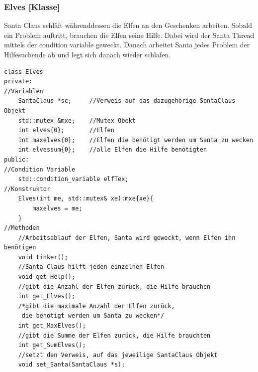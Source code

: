 \documentclass[a4paper,12pt]{article}
\begin{document}
\subsubsection{Elves [Klasse]}
Santa Claus schläft währenddessen die Elfen an den Geschenken arbeiten. Sobald ein Problem auftritt, brauchen
die Elfen seine Hilfe. Dabei wird der Santa Thread mittels der condition variable geweckt. Danach arbeitet Santa jedes Problem der Hilfesuchende ab und legt sich
danach wieder schlafen.
\begin{verbatim}
class Elves
private:
//Variablen
    SantaClaus *sc;     //Verweis auf das dazugehörige SantaClaus Objekt
    std::mutex &mxe;    //Mutex Obekt
    int elves{0};       //Elfen
    int maxelves{0};    //Elfen die benötigt werden um Santa zu wecken
    int elvessum{0};    //alle Elfen die Hilfe benötigten 
public:
//Condition Variable
    std::condition_variable elfTex;
//Konstruktor
    Elves(int me, std::mutex& xe):mxe{xe}{
        maxelves = me;
    }
//Methoden
    //Arbeitsablauf der Elfen, Santa wird geweckt, wenn Elfen ihn benötigen
    void tinker();
    //Santa Claus hilft jeden einzelnen Elfen
    void get_Help();
    //gibt die Anzahl der Elfen zurück, die Hilfe brauchen
    int get_Elves();
    /*gibt die maximale Anzahl der Elfen zurück,
     die benötigt werden um Santa zu wecken*/
    int get_MaxElves();
    //gibt die Summe der Elfen zurück, die Hilfe brauchten
    int get_SumElves();
    //setzt den Verweis, auf das jeweilige SantaClaus Objekt
    void set_Santa(SantaClaus *s);
\end{verbatim}
\end{document}

